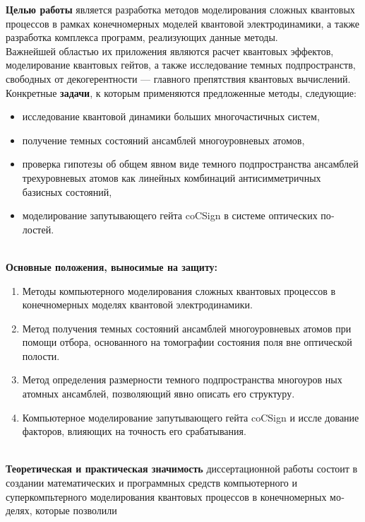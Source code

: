 \textbf{Целью работы} является разработка методов моделирования сложных квантовых процессов в рамках конечномерных моделей квантовой электродина­мики, а также разработка комплекса программ, реализующих данные методы.
\\[18pt]
\indent Важнейшей областью их приложения являются расчет квантовых эф­фектов, моделирование квантовых гейтов, а также исследование темных подпространств, свободных от декогерентности --- главного препятствия кван­товых вычислений.
\\[18pt]
\indent Конкретные \textbf{задачи}, к которым применяются предложенные методы, следующие:
\begin{itemize}
\item{исследование квантовой динамики больших многочастичных систем,}
\item{получение темных состояний ансамблей многоуровневых атомов,}
\item{проверка гипотезы об общем явном виде темного подпространства ансамблей трехуровневых атомов как линейных комбинаций антисим­метричных базисных состояний,
}
\item{моделирование запутывающего гейта coCSign в системе оптических по­лостей.}
\end{itemize}
\
\\
\indent\textbf{Основные положения, выносимые на защиту:}
\begin{enumerate}
\item{Методы компьютерного моделирования сложных квантовых процессов в конечномерных моделях квантовой электродинамики.}
\item{Метод получения темных состояний ансамблей многоуровневых атомов при помощи отбора, основанного на томографии состояния поля вне оптической полости.}
\item{Метод определения размерности темного подпространства многоуров­ ных атомных ансамблей, позволяющий явно описать его структуру.}
\item{Компьютерное моделирование запутывающего гейта coCSign и иссле­
дование факторов, влияющих на точность его срабатывания.}
\end{enumerate}
\
\\
\indent\textbf{Теоретическая и практическая значимость} диссертационной работы состоит в создании математических и программных средств компьютерного и суперкомпьтерного моделирования квантовых процессов в конечномерных мо­ делях, которые позволили
